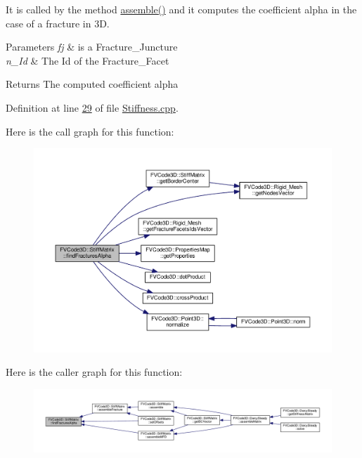 It is called by the method \hyperlink{classFVCode3D_1_1StiffMatrix_af63e81815a2ba8bd62a2156a80adce55}{assemble()} and it computes the coefficient alpha in the case of a fracture in 3D. 


\begin{DoxyParams}{Parameters}
{\em fj} & is a Fracture\+\_\+\+Juncture \\
\hline
{\em n\+\_\+\+Id} & The Id of the Fracture\+\_\+\+Facet \\
\hline
\end{DoxyParams}
\begin{DoxyReturn}{Returns}
The computed coefficient alpha 
\end{DoxyReturn}


Definition at line \hyperlink{Stiffness_8cpp_source_l00029}{29} of file \hyperlink{Stiffness_8cpp_source}{Stiffness.\+cpp}.



Here is the call graph for this function\+:
\nopagebreak
\begin{figure}[H]
\begin{center}
\leavevmode
\includegraphics[width=350pt]{classFVCode3D_1_1StiffMatrix_a53ce514c7a4c784061b5339350e00995_cgraph}
\end{center}
\end{figure}




Here is the caller graph for this function\+:
\nopagebreak
\begin{figure}[H]
\begin{center}
\leavevmode
\includegraphics[width=350pt]{classFVCode3D_1_1StiffMatrix_a53ce514c7a4c784061b5339350e00995_icgraph}
\end{center}
\end{figure}


